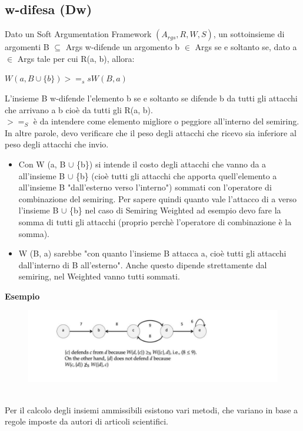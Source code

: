 \subsection{w-difesa (Dw)}
Dato un Soft Argumentation Framework $(A_{rgs} , R, W, S)$, un sottoinsieme di argomenti B $\subseteq$ Args w-difende un argomento b $\in$ Args se e soltanto se, dato a $\in$ Args tale per cui R(a, b), allora:
\begin{center}
    $W (a, B \cup \{b\}) >=_s s W (B, a)$
\end{center}
L’insieme B w-difende l’elemento b se e soltanto se difende b da tutti gli attacchi che arrivano a b cioè da tutti gli R(a, b).
\\$>=_S$ è da intendere come elemento migliore o peggiore all’interno del semiring.
\\In altre parole, devo verificare che il peso degli attacchi che ricevo sia inferiore al peso degli attacchi che invio.
\begin{itemize}
    \item Con W (a, B $\cup$ \{b\}) si intende il costo degli attacchi che vanno da a all’insieme B $\cup$ \{b\} (cioè tutti gli attacchi che apporta quell’elemento a all’insieme B "dall’esterno verso l’interno") sommati con l’operatore di combinazione del semiring. Per sapere quindi quanto vale l’attacco di a verso l’insieme B $\cup$ \{b\} nel caso di Semiring Weighted ad esempio devo fare la somma di tutti gli attacchi (proprio perchè l’operatore di combinazione è la somma).
    \item W (B, a) sarebbe "con quanto l’insieme B attacca a, cioè tutti gli attacchi dall’interno di B all’esterno". Anche questo dipende strettamente dal semiring, nel Weighted vanno tutti sommati.
\end{itemize}
\textbf{Esempio}
\begin{figure}[htp]
	\centering
    \includegraphics[width=12cm, keepaspectratio]{img/Cap6/srs.png}
\end{figure}
\\Per il calcolo degli insiemi ammissibili esistono vari metodi, che variano in base a regole imposte da autori di articoli scientifici.
\newpage
